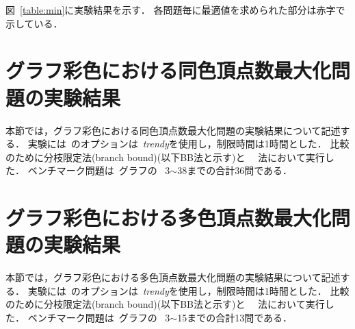 図~\ref{table:min}に実験結果を示す．
各問題毎に最適値を求められた部分は赤字で示している．


\section{グラフ彩色における同色頂点数最大化問題の実験結果}

本節では，グラフ彩色における同色頂点数最大化問題の実験結果について記述する．
実験には~{\clingo}のオプションは~\textit{trendy}を使用し，制限時間は1時間とした．
比較のために分枝限定法(branch bound)(以下BB法と示す)と
~~法において実行した．
ベンチマーク問題は~グラフの
~3$\sim$38までの合計36問である．

\section{グラフ彩色における多色頂点数最大化問題の実験結果}

本節では，グラフ彩色における多色頂点数最大化問題の実験結果について記述する．
実験には~{\clingo}のオプションは~\textit{trendy}を使用し，制限時間は1時間とした．
比較のために分枝限定法(branch bound)(以下BB法と示す)と
~~法において実行した．
ベンチマーク問題は~グラフの
~3$\sim$15までの合計13問である．

